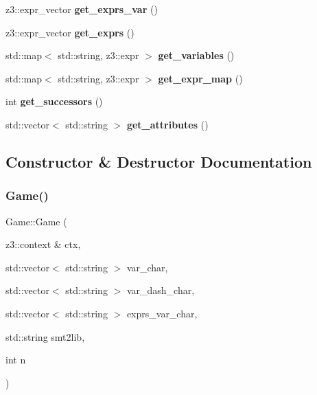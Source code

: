 \begin{DoxyCompactItemize}
\item 
\mbox{\label{classGame_abf8cdc443e10c1038a644a2f3d5ab70f}} 
z3\+::expr\+\_\+vector {\bfseries get\+\_\+exprs\+\_\+var} ()
\item 
\mbox{\label{classGame_a9f17d224ff020a442dbd44b481a10d93}} 
z3\+::expr\+\_\+vector {\bfseries get\+\_\+exprs} ()
\item 
\mbox{\label{classGame_a6fdcd6543693b71ae7080fc2cebd251f}} 
std\+::map$<$ std\+::string, z3\+::expr $>$ {\bfseries get\+\_\+variables} ()
\item 
\mbox{\label{classGame_a40e4c2b72f3c3facb9e361a8951984a6}} 
std\+::map$<$ std\+::string, z3\+::expr $>$ {\bfseries get\+\_\+expr\+\_\+map} ()
\item 
\mbox{\label{classGame_a9bb60a5d9bd93eaa7a7c9efe24df7ab0}} 
int {\bfseries get\+\_\+successors} ()
\item 
\mbox{\label{classGame_a3c36d863628a447ded4316d6d7dbc961}} 
std\+::vector$<$ std\+::string $>$ {\bfseries get\+\_\+attributes} ()
\end{DoxyCompactItemize}


\subsection{Constructor \& Destructor Documentation}
\mbox{\label{classGame_a1ae88a7d6500fc7a81bb3880cb474cac}} 
\subsubsection{\texorpdfstring{Game()}{Game()}}
{\footnotesize\ttfamily Game\+::\+Game (\begin{DoxyParamCaption}\item[{z3\+::context \&}]{ctx,  }\item[{std\+::vector$<$ std\+::string $>$}]{var\+\_\+char,  }\item[{std\+::vector$<$ std\+::string $>$}]{var\+\_\+dash\+\_\+char,  }\item[{std\+::vector$<$ std\+::string $>$}]{exprs\+\_\+var\+\_\+char,  }\item[{std\+::string}]{smt2lib,  }\item[{int}]{n }\end{DoxyParamCaption})\hspace{0.3cm}{\ttfamily [inline]}}

